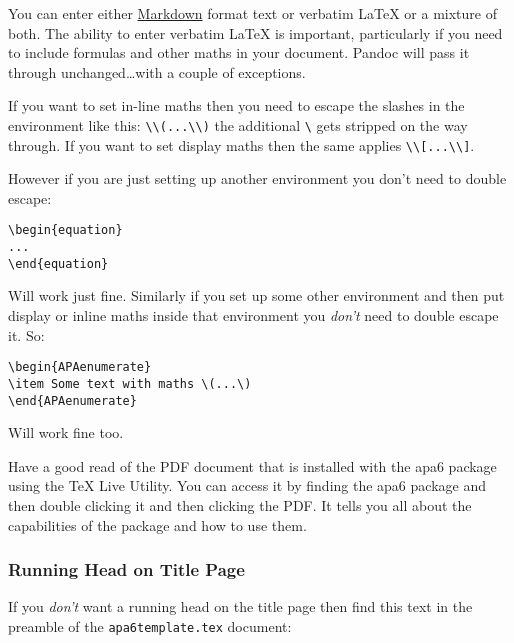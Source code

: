 You can enter either
\href{http://code.ahren.org/markdown-cheatsheet}{Markdown} format text
or verbatim LaTeX or a mixture of both. The ability to enter verbatim
LaTeX is important, particularly if you need to include formulas and
other maths in your document. Pandoc will pass it through
unchanged\ldots{}with a couple of exceptions.

If you want to set in-line maths then you need to escape the slashes in
the environment like this:
\texttt{\textbackslash{}\textbackslash{}(...\textbackslash{}\textbackslash{})}
the additional \texttt{\textbackslash{}} gets stripped on the way
through. If you want to set display maths then the same applies
\texttt{\textbackslash{}\textbackslash{}{[}...\textbackslash{}\textbackslash{}{]}}.

However if you are just setting up another environment you don't need to
double escape:

\begin{verbatim}
\begin{equation}
...
\end{equation}
\end{verbatim}

Will work just fine. Similarly if you set up some other environment and
then put display or inline maths inside that environment you
\emph{don't} need to double escape it. So:

\begin{verbatim}
\begin{APAenumerate}
\item Some text with maths \(...\)
\end{APAenumerate}
\end{verbatim}

Will work fine too.

Have a good read of the PDF document that is installed with the apa6
package using the TeX Live Utility. You can access it by finding the
apa6 package and then double clicking it and then clicking the PDF. It
tells you all about the capabilities of the package and how to use them.

\subsubsection{Running Head on Title
Page}\label{running-head-on-title-page}

If you \emph{don't} want a running head on the title page then find this
text in the preamble of the \texttt{apa6template.tex} document:

